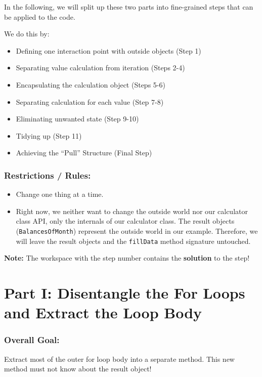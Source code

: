 \documentclass[a4paper,fleqn,titlepage,11pt]{article}
\begin{document}
In the following, we will split up these two parts into fine-grained steps that can be applied to the code.

We do this by:
\begin{itemize}
	\item Defining one interaction point with outside objects (Step 1)
	\item Separating value calculation from iteration (Steps 2-4)
	\item Encapsulating the calculation object (Steps 5-6)
	\item Separating calculation for each value (Step 7-8)
	\item Eliminating unwanted state (Step 9-10)
	\item Tidying up (Step 11)
	\item Achieving the ``Pull'' Structure (Final Step)
\end{itemize}

\subsubsection*{Restrictions / Rules:}


\begin{itemize}
\item Change one thing at a time.

\item Right now, we neither want to change the outside world nor our calculator class API, only the internals of our calculator class. The result objects (\texttt{BalancesOfMonth}) represent the outside world in our example. Therefore, we will leave the result objects and the \texttt{fillData} method signature untouched. 
\end{itemize}


\textbf{Note:} The workspace with the step number contains the \textbf{solution} to the step!

\section*{Part I: Disentangle the For Loops and Extract the Loop Body}

\subsubsection*{Overall Goal:}

Extract most of the outer for loop body into a separate method. This new method must not know about the result object!
\end{document}
